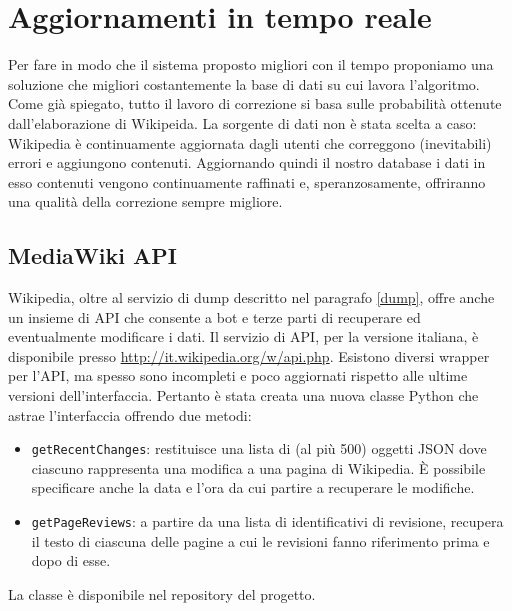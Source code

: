 \section{Aggiornamenti in tempo reale}
Per fare in modo che il sistema proposto migliori con il tempo proponiamo una soluzione che migliori costantemente la base di dati su cui lavora l'algoritmo. Come già spiegato, tutto il lavoro di correzione si basa sulle probabilità ottenute dall'elaborazione di Wikipeida. La sorgente di dati non è stata scelta a caso: Wikipedia è continuamente aggiornata dagli utenti che correggono (inevitabili) errori e aggiungono contenuti.
Aggiornando quindi il nostro database i dati in esso contenuti vengono continuamente raffinati e, speranzosamente, offriranno una qualità della correzione sempre migliore.

\subsection{MediaWiki API}
\label{wikiapi}
Wikipedia, oltre al servizio di dump descritto nel paragrafo \ref{dump}, offre anche un insieme di API che consente a bot e terze parti di recuperare ed eventualmente modificare i dati. Il servizio di API, per la versione italiana, è disponibile presso \url{http://it.wikipedia.org/w/api.php}. Esistono diversi wrapper per l'API, ma spesso sono incompleti e poco aggiornati rispetto alle ultime versioni dell'interfaccia. Pertanto è stata creata una nuova classe Python che astrae l'interfaccia offrendo due metodi:
\begin{itemize}
\item \texttt{getRecentChanges}: restituisce una lista di (al più 500) oggetti JSON dove ciascuno rappresenta una modifica a una pagina di Wikipedia. È possibile specificare anche la data e l'ora da cui partire a recuperare le modifiche.
\item \texttt{getPageReviews}: a partire da una lista di identificativi di revisione, recupera il testo di ciascuna delle pagine a cui le revisioni fanno riferimento prima e dopo di esse.
\end{itemize}
La classe è disponibile nel repository del progetto.
